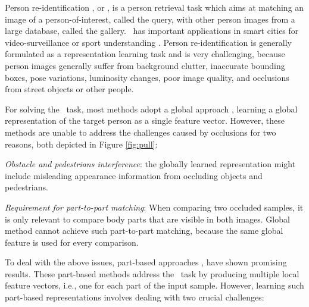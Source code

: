 \documentclass[10pt,twocolumn,letterpaper]{article}
\begin{document}
Person re-identification \cite{Ye2021, occluded_reid_survey}, or \reid, is a person retrieval task which aims at matching an image of a person-of-interest, called the query, with other person images from a large database, called the gallery. \reid\ has important applications in smart cities for video-surveillance \cite{market1501, duke-mtmc} or sport understanding \cite{deepsportradarv1, soccernet22}.
Person re-identification is generally formulated as a representation learning task and is very challenging, because person images generally suffer from background clutter, inaccurate bounding boxes, pose variations, luminosity changes, poor image quality, and occlusions \cite{occluded_reid_survey} from street objects or other people. 



For solving the \reid\ task, most methods adopt a global approach \cite{BoT, triplet}, learning a global representation of the target person as a single feature vector.
However, these methods are unable to address the challenges caused by occlusions for two reasons, both depicted in Figure \ref{fig:pull}:

 \textit{Obstacle and pedestrians interference}: the globally learned representation might include misleading appearance information from occluding objects and pedestrians.


 \textit{Requirement for part-to-part matching}: 
When comparing two occluded samples, it is only relevant to compare body parts that are visible in both images.
Global method cannot achieve such part-to-part matching, because the same global feature is used for every comparison.





To deal with the above issues, part-based approaches \cite{PCB, ISP, HLGAT}, have shown promising results.
These part-based methods address the \reid\ task by producing multiple local feature vectors, i.e., one for each part of the input sample.
However, learning such part-based representations involves dealing with two crucial challenges:
\end{document}
